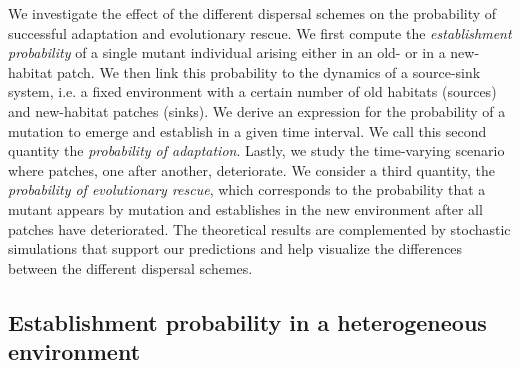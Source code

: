 \documentclass[a4paper,11pt]{article}
\newcommand{\chg}[1]{\textcolor{change}{#1}}
\begin{document}
We investigate the effect of the different dispersal schemes on the probability of successful adaptation and evolutionary rescue. We first compute the \textit{establishment probability} of a single mutant individual arising either in an old- or in a new-habitat patch. We then link this probability to the dynamics of a source-sink system, i.e. a fixed environment with a certain number of old habitats (sources) and new-habitat patches (sinks). We derive an expression for the probability of a mutation to emerge and establish in a given time interval. We call this second quantity the \textit{probability of adaptation}. Lastly, we study the time-varying scenario where patches, one after \chg{another}, deteriorate. We consider a third quantity, the \textit{probability of evolutionary rescue}, which corresponds to the probability that a mutant appears by mutation and establishes in the new environment \chg{after} all patches have deteriorated. The theoretical results are complemented by stochastic simulations that support our predictions and help visualize the differences between the different dispersal schemes.

\subsection*{Establishment probability in a heterogeneous environment}\label{subsec:establishment}
\end{document}
